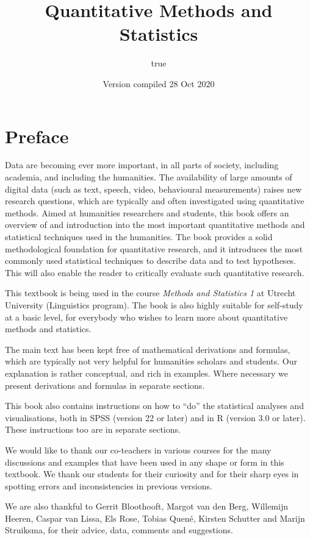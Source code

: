 \documentclass[
]{book}
\title{Quantitative Methods and Statistics}
\author{true}
\date{Version compiled 28 Oct 2020}
\begin{document}
\maketitle

{
\setcounter{tocdepth}{1}
\tableofcontents
}
\hypertarget{preface}{%
\chapter*{Preface}\label{preface}}

Data are becoming ever more important, in all parts of society, including academia, and including the humanities. The availability of large amounts of digital data (such as text, speech, video, behavioural measurements) raises new research questions, which are typically and often investigated using quantitative methods.
Aimed at humanities researchers and students, this book offers an overview of and introduction into the most important quantitative methods and statistical techniques used in the humanities. The book provides a solid methodological foundation for quantitative research, and it introduces the most commonly used statistical techniques to describe data and to test hypotheses. This will also enable the reader to critically evaluate such quantitative research.

This textbook is being used in the course \emph{Methods and Statistics 1} at Utrecht University (Linguistics program). The book is also highly suitable for self-study at a basic level, for everybody who wishes to learn more about quantitative methods and statistics.

The main text has been kept free of mathematical derivations and formulas, which are typically not very helpful for humanities scholars and students. Our explanation is rather conceptual, and rich in examples. Where necessary we present derivations and formulas in separate sections.

This book also contains instructions on how to ``do'' the statistical analyses and visualisations, both in SPSS (version 22 or later) and in R (version 3.0 or later). These instructions too are in separate sections.

We would like to thank our co-teachers in various courses for the many discussions and examples that have been used in any shape or form in this textbook. We thank our students for their curiosity and for their sharp eyes in spotting errors and inconsistencies in previous versions.

We are also thankful to
Gerrit Bloothooft,
Margot van den Berg,
Willemijn Heeren,
Caspar van Lissa,
Els Rose,
Tobias Quené,
Kirsten Schutter
and Marijn Struiksma,
for their advice, data, comments and suggestions.
\end{document}
